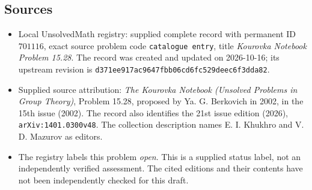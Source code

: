 \documentclass[11pt]{article}
\begin{document}
\subsection{Sources}
\begin{itemize}
\item Local UnsolvedMath registry: supplied complete record with permanent ID \(701116\), exact source problem code \texttt{catalogue entry}, title \emph{Kourovka Notebook Problem 15.28}. The record was created and updated on 2026-10-16; its upstream revision is \texttt{d371ee917ac9647fbb06cd6fc529deec6f3dda82}.
\item Supplied source attribution: \emph{The Kourovka Notebook (Unsolved Problems in Group Theory)}, Problem 15.28, proposed by Ya. G. Berkovich in 2002, in the 15th issue (2002). The record also identifies the 21st issue edition (2026), \texttt{arXiv:1401.0300v48}. The collection description names E. I. Khukhro and V. D. Mazurov as editors.
\item The registry labels this problem \emph{open}. This is a supplied status label, not an independently verified assessment. The cited editions and their contents have not been independently checked for this draft.
\end{itemize}
\end{document}
